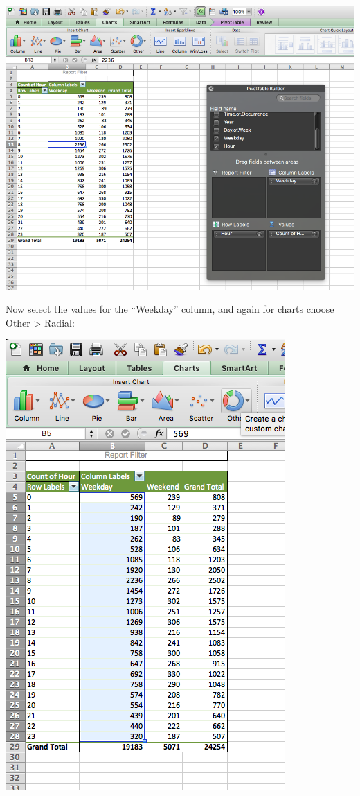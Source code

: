 \documentclass[]{book}
\theoremstyle{definition}
\theoremstyle{definition}
\theoremstyle{definition}
\theoremstyle{remark}
\begin{document}
\includegraphics{imgs/bi_radar_1.png}

Now select the values for the ``Weekday'' column, and again for charts
choose Other \textgreater{} Radial:

\includegraphics{imgs/hr_r_20.png}
\end{document}
